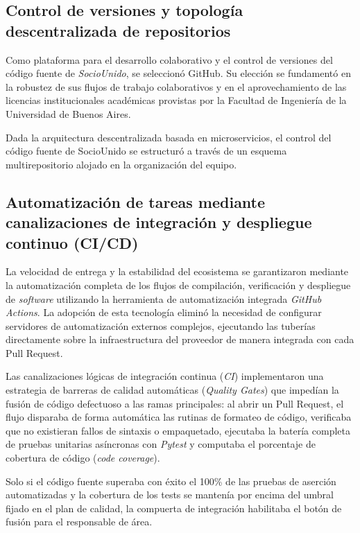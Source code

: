 \subsection{Control de versiones y topología descentralizada de repositorios}

Como plataforma para el desarrollo colaborativo y el control de versiones del código fuente de \textit{SocioUnido}, se seleccionó GitHub. Su elección se fundamentó en la robustez de sus flujos de trabajo colaborativos y en el aprovechamiento de las licencias institucionales académicas provistas por la Facultad de Ingeniería de la Universidad de Buenos Aires. 

Dada la arquitectura descentralizada basada en microservicios, el control del código fuente de SocioUnido se estructuró a través de un esquema multirepositorio alojado en la organización del equipo.

\subsection{Automatización de tareas mediante canalizaciones de integración y despliegue continuo (CI/CD)}

La velocidad de entrega y la estabilidad del ecosistema se garantizaron mediante la automatización completa de los flujos de compilación, verificación y despliegue de \textit{software} utilizando la herramienta de automatización integrada \textit{GitHub Actions}. La adopción de esta tecnología eliminó la necesidad de configurar servidores de automatización externos complejos, ejecutando las tuberías directamente sobre la infraestructura del proveedor de manera integrada con cada Pull Request.

Las canalizaciones lógicas de integración continua (\textit{CI}) implementaron una estrategia de barreras de calidad automáticas (\textit{Quality Gates}) que impedían la fusión de código defectuoso a las ramas principales: al abrir un Pull Request, el flujo disparaba de forma automática las rutinas de formateo de código, verificaba que no existieran fallos de sintaxis o empaquetado, ejecutaba la batería completa de pruebas unitarias asíncronas con \textit{Pytest} y computaba el porcentaje de cobertura de código (\textit{code coverage}). 

Solo si el código fuente superaba con éxito el 100\% de las pruebas de aserción automatizadas y la cobertura de los tests se mantenía por encima del umbral fijado en el plan de calidad, la compuerta de integración habilitaba el botón de fusión para el responsable de área.

